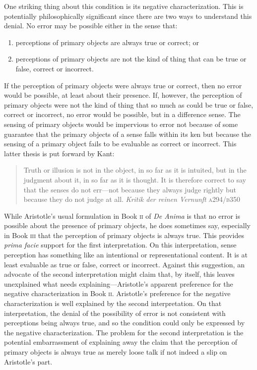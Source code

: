 One striking thing about this condition is its negative characterization. This is potentially philosophically significant since there are two ways to understand this denial. No error may be possible either in the sense that:
\begin{enumerate}[(1)]
	\item perceptions of primary objects are always true or correct; or
	\item perceptions of primary objects are not the kind of thing that can be true or false, correct or incorrect.
\end{enumerate}
If the perception of primary objects were always true or correct, then no error would be possible, at least about their presence. If, however, the perception of primary objects were not the kind of thing that so much as could be true or false, correct or incorrect, no error would be possible, but in a difference sense. The sensing of primary objects would be impervious to error not because of some guarantee that the primary objects of a sense falls within its ken but because the sensing of a primary object fails to be evaluable as correct or incorrect. This latter thesis is put forward by Kant:
\begin{quote}
	Truth or illusion is not in the object, in so far as it is intuited, but in the judgment about it, in so far as it is thought. It is therefore correct to say that the senses do not err---not because they always judge rightly but because they do not judge at all. \emph{Kritik der reinen Vernunft} \textsc{a}294/\textsc{b}350
\end{quote}

While Aristotle's usual formulation in Book \textsc{ii} of \emph{De Anima} is that no error is possible about the presence of primary objects, he does sometimes say, especially in Book \textsc{iii} that the perception of primary objects is always true. This provides \emph{prima facie} support for the first interpretation. On this interpretation, sense perception has something like an intentional or representational content. It is at least evaluable as true or false, correct or incorrect. Against this suggestion, an advocate of the second interpretation might claim that, by itself, this leaves unexplained what needs explaining---\-Aristotle's apparent preference for the negative characterization in Book \textsc{ii}. Aristotle's preference for the negative characterization is well explained by the second interpretation. On that interpretation, the denial of the possibility of error is not consistent with perceptions being always true, and so the condition could only be expressed by the negative characterization. The problem for the second interpretation is the potential embarrassment of explaining away the claim that the perception of primary objects is always true as merely loose talk if not indeed a slip on Aristotle's part.

